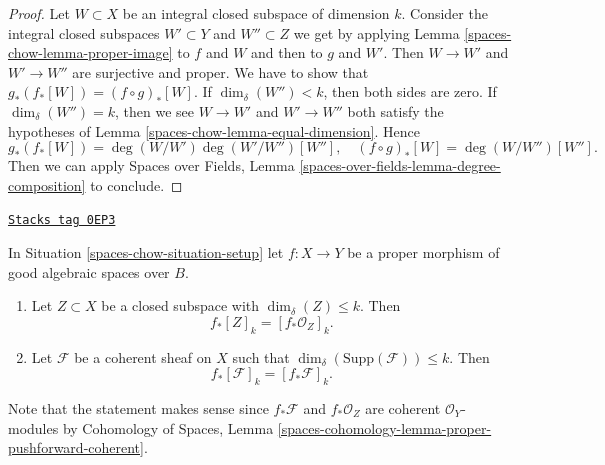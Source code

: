 \begin{proof}
Let $W \subset X$ be an integral closed subspace of dimension $k$.
Consider the integral closed subspaces
$W' \subset Y$ and $W'' \subset Z$
we get by applying Lemma \ref{spaces-chow-lemma-proper-image}
to $f$ and $W$ and then to $g$ and $W'$.
Then $W \to W'$ and $W' \to W''$ are surjective and proper.
We have to show that $g_*(f_*[W]) = (f \circ g)_*[W]$.
If $\dim_\delta(W'') < k$, then both sides are zero.
If $\dim_\delta(W'') = k$, then we see $W \to W'$ and $W' \to W''$
both satisfy the hypotheses of Lemma \ref{spaces-chow-lemma-equal-dimension}.
Hence
$$
g_*(f_*[W]) = \deg(W/W')\deg(W'/W'')[W''],
\quad
(f \circ g)_*[W] = \deg(W/W'')[W''].
$$
Then we can apply
Spaces over Fields, Lemma \ref{spaces-over-fields-lemma-degree-composition}
to conclude.
\end{proof}

\begin{lemma}
\label{spaces-chow-lemma-cycle-push-sheaf}
\href{https://stacks.math.columbia.edu/tag/0EP3}{\texttt{Stacks tag 0EP3}}

In Situation \ref{spaces-chow-situation-setup} let $f : X \to Y$ be a proper morphism
of good algebraic spaces over $B$.
\begin{enumerate}
\item Let $Z \subset X$ be a closed subspace with $\dim_\delta(Z) \leq k$.
Then
$$
f_*[Z]_k = [f_*{\mathcal O}_Z]_k.
$$
\item Let $\mathcal{F}$ be a coherent sheaf on $X$ such that
$\dim_\delta(\text{Supp}(\mathcal{F})) \leq k$. Then
$$
f_*[\mathcal{F}]_k = [f_*{\mathcal F}]_k.
$$
\end{enumerate}
Note that the statement makes sense since $f_*\mathcal{F}$ and
$f_*\mathcal{O}_Z$ are coherent $\mathcal{O}_Y$-modules by
Cohomology of Spaces, Lemma
\ref{spaces-cohomology-lemma-proper-pushforward-coherent}.
\end{lemma}

